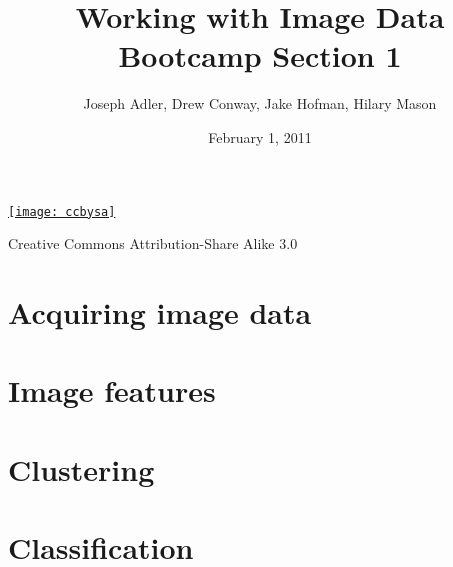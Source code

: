 \documentclass[xcolor=dvipsnames, 9pt]{beamer}
\title{Working with Image Data\\Bootcamp Section 1}
\author{Joseph Adler, Drew Conway, Jake Hofman, Hilary Mason}
\date{February 1, 2011}
\begin{document}
 

\begin{frame}[plain]
  \titlepage 
  
  \tiny
  \href{http://creativecommons.org/licenses/by-sa/3.0/us/}{\texttt{[image: ccbysa]}}

  Creative Commons Attribution-Share Alike 3.0
\end{frame}





\section{Acquiring image data}



\section{Image features}


\section{Clustering}


\section{Classification}

\end{document}
